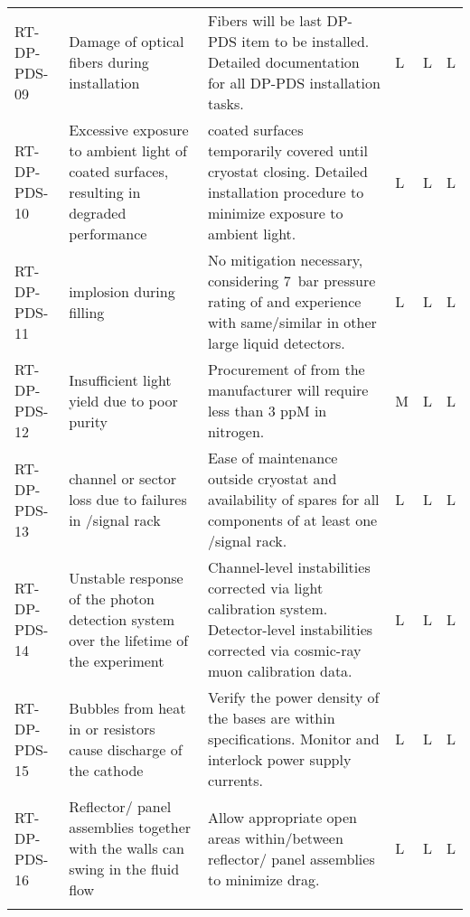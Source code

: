 \begin{footnotesize}
\begin{longtable}{P{0.18\textwidth}P{0.20\textwidth}P{0.32\textwidth}P{0.02\textwidth}P{0.02\textwidth}P{0.02\textwidth}}
RT-DP-PDS-09 & Damage of optical fibers during installation & Fibers will be last DP-PDS item to be installed. Detailed documentation for all DP-PDS installation tasks.   & L & L & L \\  \colhline
RT-DP-PDS-10 & Excessive exposure to ambient light of  coated surfaces, resulting in degraded performance &  coated surfaces temporarily covered until cryostat closing. Detailed installation procedure to minimize exposure to ambient light. & L & L & L \\  \colhline
RT-DP-PDS-11 &  implosion during  filling & No mitigation necessary, considering \SI{7}{bar} pressure rating of  and experience with same/similar  in other large liquid detectors. & L & L & L \\  \colhline
RT-DP-PDS-12 & Insufficient light yield due to poor  purity & Procurement of  from the manufacturer will require less than 3 ppM in nitrogen. & M & L & L \\  \colhline
RT-DP-PDS-13 &  channel or  sector loss due to failures in /signal rack & Ease of maintenance outside cryostat and availability of spares for all components of at least one /signal rack. & L & L & L \\  \colhline
RT-DP-PDS-14 & Unstable response of the photon detection system over the lifetime of the experiment & Channel-level instabilities corrected via light calibration system. Detector-level instabilities corrected via cosmic-ray muon calibration data. & L & L & L \\  \colhline
RT-DP-PDS-15 & Bubbles from heat in  or resistors cause  discharge of the cathode & Verify the power density of the  bases are within specifications. Monitor and interlock  power supply currents. & L & L & L \\  \colhline
RT-DP-PDS-16 & Reflector/ panel assemblies together with the  walls can swing in the fluid flow & Allow appropriate open areas within/between reflector/ panel assemblies to minimize drag. & L & L & L \\  \colhline

\label{tab:risks:DP-FD-PDS}
\end{longtable}
\end{footnotesize}
